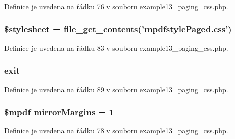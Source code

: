 Definice je uvedena na řádku 76 v souboru example13\-\_\-paging\-\_\-css.\-php.

\hypertarget{example13__paging__css_8php_a19e5cf73e817c55a49205e6ec78c88a8}{
\subsubsection[{\$stylesheet}]{\setlength{\rightskip}{0pt plus 5cm}\$stylesheet = file\-\_\-get\-\_\-contents('mpdfstyle\-Paged.\-css')}}\label{example13__paging__css_8php_a19e5cf73e817c55a49205e6ec78c88a8}


Definice je uvedena na řádku 83 v souboru example13\-\_\-paging\-\_\-css.\-php.

\hypertarget{example13__paging__css_8php_a6733eb5f605d09eaede9845835d71c4e}{
\subsubsection[{exit}]{\setlength{\rightskip}{0pt plus 5cm}exit}}\label{example13__paging__css_8php_a6733eb5f605d09eaede9845835d71c4e}


Definice je uvedena na řádku 89 v souboru example13\-\_\-paging\-\_\-css.\-php.

\hypertarget{example13__paging__css_8php_a24c284cb7774410f65953584ea1fd9c1}{
\subsubsection[{mirror\-Margins}]{\setlength{\rightskip}{0pt plus 5cm}\$mpdf mirror\-Margins = 1}}\label{example13__paging__css_8php_a24c284cb7774410f65953584ea1fd9c1}


Definice je uvedena na řádku 78 v souboru example13\-\_\-paging\-\_\-css.\-php.

